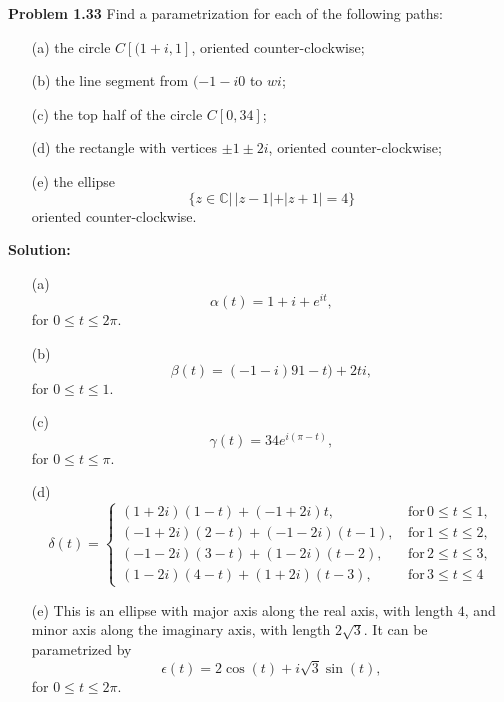 \documentclass[12pt,oneside]{exam}
\newenvironment{exercise}[1]{\vspace{.1in}\noindent\textbf{Problem #1 \hspace{.05em}}}{}
\begin{document}
\begin{exercise}{1.33}
Find a parametrization for each of the following paths:
\begin{itemize}
\item[(a)] the circle $C[(1+i,1]$, oriented counter-clockwise;
\item[(b)] the line segment from $(-1-i0$ to $wi$;
\item[(c)] the top half of the circle $C[0,34]$;
\item[(d)] the rectangle with vertices $\pm 1 \pm 2i$, oriented counter-clockwise;
\item[(e)] the ellipse 
\begin{equation*}
\{z \in \mathbb{C} | \, |z-1|+|z+1|=4\}
\end{equation*}
oriented counter-clockwise.
\end{itemize}
\end{exercise}

\vspace{0.5cm}

\noindent \textbf{Solution:} 
\begin{itemize}
\item[(a)] 
\begin{equation*}
\alpha(t) = 1+i + e^{it},
\end{equation*}
for $0 \leq t \leq 2\pi$.
\item[(b)] 
\begin{equation*}
\beta(t) = (-1-i)91-t)+2ti,
\end{equation*}
for $0 \leq t \leq 1$.
\item[(c)] 
\begin{equation*}
\gamma(t) = 34e^{i(\pi-t)}, 
\end{equation*}
for $0 \leq t \leq \pi$.
\item[(d)] 
\begin{equation*}
\delta(t) = \left\{ 
\begin{array}{rl}
(1+2i)(1-t)+(-1+2i)t, & \, \mbox{for} \, 0 \leq t \leq 1,\\
(-1+2i)(2-t)+(-1-2i)(t-1), & \, \mbox{for} \, 1 \leq t \leq 2,\\
(-1-2i)(3-t)+(1-2i)(t-2), & \, \mbox{for} \, 2 \leq t \leq 3,\\
(1-2i)(4-t) + (1+2i)(t-3), & \, \mbox{for} \, 3 \leq t \leq 4
\end{array}
\right.
\end{equation*}
\item[(e)] This is an ellipse with major axis along the real axis, with length $4$, and minor axis along the imaginary axis, with length $2\sqrt{3}$. It can be parametrized by 
\begin{equation*}
\epsilon(t) = 2\cos(t)+i\sqrt{3}\sin(t),
\end{equation*}
for $0 \leq t \leq 2\pi$.
\end{itemize}
\end{document}
